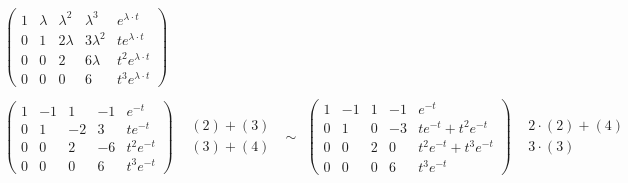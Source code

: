 \begin{equation*}
\begin{array}{l}
 \begin{array}{ll}
  \left(
   \begin{array}{cccc|c}
    1 & \lambda & \lambda^2 & \lambda^3 & e^{\lambda\cdot t}\\
    0 & 1 & 2\lambda & 3\lambda^2 & t e^{\lambda\cdot t}\\
    0 & 0 & 2 & 6\lambda & t^2 e^{\lambda\cdot t}\\
    0 & 0 & 0 & 6 & t^3 e^{\lambda\cdot t}
   \end{array}  \right) & 
  \begin{array}{l}
    ~\\
    ~\\
    ~\\
    ~
  \end{array}
  \end{array} \\
 \begin{array}{ll}
  \left(\begin{array}{cccc|c}
    1 & -1 & 1 & -1 & e^{-t}\\
    0 & 1 & -2 & 3 & t e^{-t}\\
    0 & 0 & 2 & -6 & t^2 e^{-t}\\
    0 & 0 & 0 & 6 & t^3 e^{-t}
   \end{array}
  \right) & 
  \begin{array}{l}
    ~\\
    (2) + (3)\\
    (3) + (4)\\
    ~
  \end{array}
 \end{array}
 \sim
 \begin{array}{ll}
  \left(\begin{array}{cccc|c}
    1 & -1 & 1 & -1 & e^{-t}\\
    0 & 1 & 0 & -3 & t e^{-t} + t^2 e^{-t}\\
    0 & 0 & 2 & 0 & t^2 e^{-t} + t^3 e^{-t}\\
    0 & 0 & 0 & 6 & t^3 e^{-t}
   \end{array}
  \right) & 
  \begin{array}{l}
    ~\\
    2\cdot(2) + (4)\\
    3\cdot(3)\\
    ~
  \end{array}
 \end{array}

\end{array}
\end{equation*}

